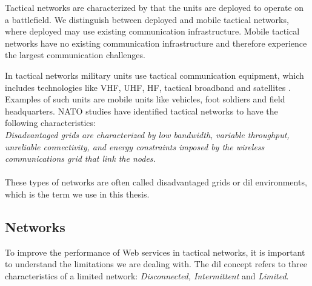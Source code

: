Tactical networks are characterized by that the units are deployed to operate on
a battlefield. We distinguish between deployed and mobile tactical networks,
where deployed may use existing communication infrastructure. Mobile tactical
networks have no existing communication infrastructure and therefore experience
the largest communication challenges.

 In tactical networks military units use tactical communication equipment, which
 includes technologies like VHF, UHF, HF, tactical broadband and satellites
 \cite{ist-090}. Examples of such units are mobile units like vehicles, foot
 soldiers and field headquarters. NATO studies\cite{nato-disadvantaged-grids}
 have identified tactical networks to have the following characteristics: \\

\textit{
Disadvantaged grids are characterized by low bandwidth, variable throughput,
unreliable connectivity, and energy constraints imposed by the wireless
communications grid that link the nodes.
}

\paragraph{}

These types of networks are often called disadvantaged grids or \gls{dil}
environments, which is the term we use in this thesis.

\subsection{ Networks}
\label{dil}

To improve the performance of Web services in tactical networks, it is important
to understand the limitations we are dealing with. The \gls{dil} concept refers
to three characteristics of a limited network: \textit{Disconnected,
Intermittent} and \textit{Limited}.

